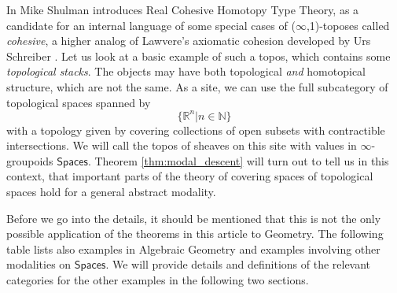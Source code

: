 \documentclass[9pt,twosided]{amsart}
\newcommand{\bN}{\mathbb N}
\newcommand{\bR}{\mathbb R}
\newcommand{\Spaces}{\ensuremath{\mathsf{Spaces}}}
\begin{document}
In \cite{ShulmanRealCohesion} Mike Shulman introduces Real Cohesive Homotopy Type Theory, as a candidate for an internal language
of some special cases of ($\infty$,1)-toposes called \emph{cohesive}, a higher analog 
of Lawvere's axiomatic cohesion \cite{Lawvere07} developed by Urs Schreiber \cite{SchreiberDcct}.
Let us look at a basic example of such a topos, which contains some \emph{topological stacks}.
The objects may have both topological \emph{and} homotopical structure, which are not the same.
As a site, we can use the full subcategory of topological spaces spanned by
\[ \{ \bR^n \vert n\in\bN\}\]
with a topology given by covering collections of open subsets with contractible intersections.
We will call the topos of sheaves on this site with values in $\infty$-groupoids $\Spaces$. 
Theorem \ref{thm:modal_descent} will turn out to tell us in this context, that important parts of the theory of covering spaces of topological spaces hold for a general abstract modality.

Before we go into the details, it should be mentioned that this is not the only possible application of the theorems in this article to Geometry.
The following table lists also examples in Algebraic Geometry and examples involving other modalities on $\Spaces$.
We will provide details and definitions of the relevant categories for the other examples in the following two sections.
\end{document}
